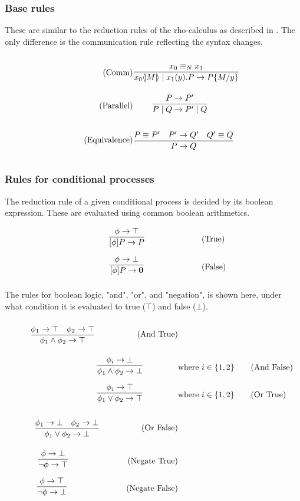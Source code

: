 \subsubsection{Base rules}
These are similar to the reduction rules of the rho-calculus as described in \citep{Meredith2005}. The only difference is the communication rule reflecting the syntax changes.

\begin{align}
    \tag{Comm} \infrule{x_0 \equiv_N x_1}{\lift{x_0}{M}\para\inp{x_1}{y}P\ra P\{M/y\}}&\\
    \tag{Parallel} \infrule{P\ra P'}{P\para Q\ra P'\para Q}&\\
    \tag{Equivalence} \infrule{P\equiv P'\quad P'\ra Q'\quad Q'\equiv Q}{P\ra Q}&
\end{align}

\FloatBarrier

\subsubsection{Rules for conditional processes}
The reduction rule of a given conditional process is decided by its boolean expression. These are evaluated using common boolean arithmetics.

\begin{align}
    & \infrule{\phi \ra \top}{[\phi]P\ra P} \tag{True}\\
    & \infrule{\phi \ra \bot}{[\phi]P\ra \nil} \tag{False}
\end{align}

The rules for boolean logic, "and", "or", and "negation", is shown here, under what condition it is evaluated to true (\ensuremath{\top}) and false (\ensuremath{\bot}).
\begin{align*}
    \infrule{\phi_1 \ra \top \quad \phi_2 \ra \top}{\phi_1 \wedge \phi_2 \ra \top}\tag{And True}\\
    \infrule{\phi_i \ra \bot}{\phi_1 \wedge \phi_2 \ra \bot} &\text{where}\ i\in \{1,2\}\tag{And False}\\
    \infrule{\phi_i \ra \top}{\phi_1 \vee \phi_2 \ra \top} &\text{where}\ i\in \{1,2\} \tag{Or True}\\
    \infrule{\phi_1 \ra \bot \quad \phi_2 \ra \bot}{\phi_1 \vee \phi_2 \ra \bot} \tag{Or False}\\
    \infrule{\phi \ra \bot}{\neg\phi \ra \top} \tag{Negate True}\\
    \infrule{\phi \ra \top}{\neg\phi \ra \bot} \tag{Negate False}\\
\end{align*}

